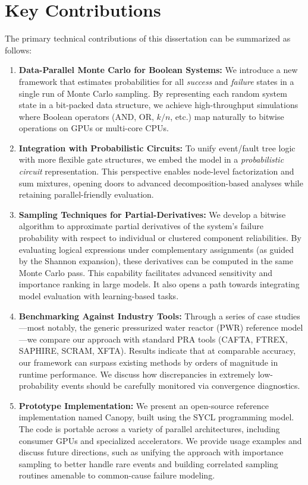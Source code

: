 \section{Key Contributions}
The primary technical contributions of this dissertation can be summarized as follows:

\begin{enumerate}
\item \textbf{Data-Parallel Monte Carlo for Boolean Systems:}  
We introduce a new framework that estimates probabilities for all \emph{success} and \emph{failure} states in a single run of Monte Carlo sampling. By representing each random system state in a bit-packed data structure, we achieve high-throughput simulations where Boolean operators (AND, OR, \(k/n\), etc.) map naturally to bitwise operations on GPUs or multi-core CPUs.

\item \textbf{Integration with Probabilistic Circuits:}  
To unify event/fault tree logic with more flexible gate structures, we embed the model in a \emph{probabilistic circuit} representation. This perspective enables node-level factorization and sum mixtures, opening doors to advanced decomposition-based analyses while retaining parallel-friendly evaluation.

\item \textbf{Sampling Techniques for Partial-Derivatives:}  
We develop a bitwise algorithm to approximate partial derivatives of the system’s failure probability with respect to individual or clustered component reliabilities. By evaluating logical expressions under complementary assignments (as guided by the Shannon expansion), these derivatives can be computed in the same Monte Carlo pass. This capability facilitates advanced sensitivity and importance ranking in large models. It also opens a path towards integrating model evaluation with learning-based tasks.

\item \textbf{Benchmarking Against Industry Tools:}  
Through a series of case studies—most notably, the generic pressurized water reactor (PWR) reference model—we compare our approach with standard PRA tools (CAFTA, FTREX, SAPHIRE, SCRAM, XFTA). Results indicate that at comparable accuracy, our framework can surpass existing methods by orders of magnitude in runtime performance. We discuss how discrepancies in extremely low-probability events should be carefully monitored via convergence diagnostics.

\item \textbf{Prototype Implementation:}  
We present an open-source reference implementation named Canopy, built using the SYCL programming model. The code is portable across a variety of parallel architectures, including consumer GPUs and specialized accelerators. We provide usage examples and discuss future directions, such as unifying the approach with importance sampling to better handle rare events and building correlated sampling routines amenable to common-cause failure modeling.
\end{enumerate}